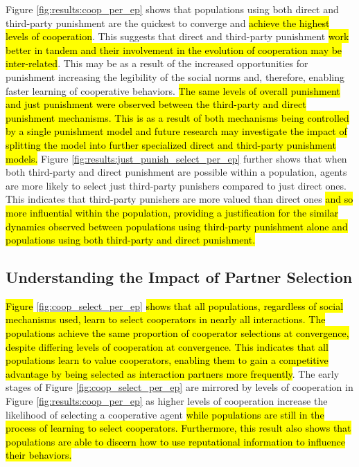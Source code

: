 \documentclass[sn-aps,numbered]{sn-jnl}%
\theoremstyle{thmstyleone}%
\theoremstyle{thmstyletwo}%
\theoremstyle{thmstylethree}%
\begin{document}
Figure \ref{fig:results:coop_per_ep} shows that populations using both direct and third-party punishment are the quickest to converge and \hl{achieve the highest levels of cooperation}. This suggests that direct and third-party punishment \hl{work better in tandem and their involvement in the evolution of cooperation may be inter-related}. This may be as a result of the increased opportunities for punishment increasing the legibility of the social norms \citep{legible_normativity_hadfield} and, therefore, enabling faster learning of cooperative behaviors. \hl{The same levels of overall punishment and just punishment were observed between the third-party and direct punishment mechanisms. This is as a result of both mechanisms being controlled by a single punishment model and future research may investigate the impact of splitting the model into further specialized direct and third-party punishment models.} Figure \ref{fig:results:just_punish_select_per_ep} further shows that when both third-party and direct punishment are possible within a population, agents are more likely to select just third-party punishers compared to just direct ones. This indicates that third-party punishers are more valued than direct ones \hl{and so more influential within the population, providing a justification for the similar dynamics observed between populations using third-party punishment alone and populations using both third-party and direct punishment.}

\noindent \subsection{Understanding the Impact of Partner Selection}

\hl{Figure} \ref{fig:coop_select_per_ep} \hl{shows that all populations, regardless of social mechanisms used, learn to select cooperators in nearly all interactions. The populations achieve the same proportion of cooperator selections at convergence, despite differing levels of cooperation at convergence. This indicates that all populations learn to value cooperators, enabling them to gain a competitive advantage by being selected as interaction partners more frequently}. The early stages of Figure \ref{fig:coop_select_per_ep} are mirrored by levels of cooperation in Figure \ref{fig:results:coop_per_ep} as higher levels of cooperation increase the likelihood of selecting a cooperative agent \hl{while populations are still in the process of learning to select cooperators. Furthermore, this result also shows that populations are able to discern how to use reputational information to influence their behaviors.}
\end{document}
